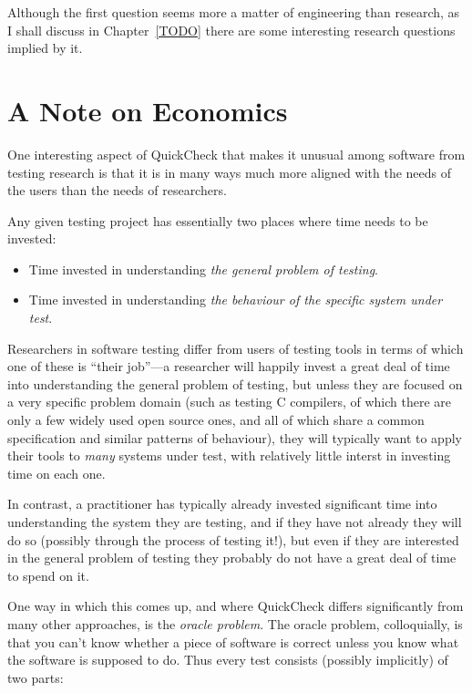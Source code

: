 Although the first question seems more a matter of engineering than research,
as I shall discuss in Chapter~\ref{TODO} there are some interesting research questions implied by it.

\chapter{A Note on Economics}

One interesting aspect of QuickCheck that makes it unusual among software from testing research is that it is in many ways much more aligned with the needs of the users than the needs of researchers.

Any given testing project has essentially two places where time needs to be invested:

\begin{itemize}
\item Time invested in understanding \emph{the general problem of testing}.
\item Time invested in understanding \emph{the behaviour of the specific system under test}.
\end{itemize}

Researchers in software testing differ from users of testing tools in terms of which one of these is ``their job''---a
researcher will happily invest a great deal of time into understanding the general problem of testing,
but unless they are focused on a very specific problem domain (such as testing C compilers,
of which there are only a few widely used open source ones,
and all of which share a common specification and similar patterns of behaviour),
they will typically want to apply their tools to \emph{many} systems under test,
with relatively little interst in investing time on each one.

In contrast,
a practitioner has typically already invested significant time into understanding the system they are testing,
and if they have not already they will do so (possibly through the process of testing it!),
but even if they are interested in the general problem of testing they probably do not have a great deal of time to spend on it.

One way in which this comes up,
and where QuickCheck differs significantly from many other approaches,
is the \emph{oracle problem}.
The oracle problem,
colloquially,
is that you can't know whether a piece of software is correct unless you know what the software is supposed to do.
Thus every test consists (possibly implicitly) of two parts:

